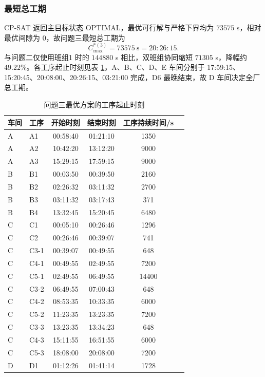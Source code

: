 \documentclass[12pt,a4paper]{article}
\begin{document}
\subsubsection{最短总工期}

CP-SAT 返回主目标状态 OPTIMAL，最优可行解与严格下界均为 $73575$ s，相对最优间隙为 0，故问题三最短总工期为
\begin{equation}
C_{\max}^{*(3)}=73575\ \text{s}=20:26:15 .
\end{equation}
与问题二仅使用班组1 时的 $144880$ s 相比，双班组协同缩短 $71305$ s，降幅约 $49.22\%$。各工序起止时刻见表 \ref{tab:p3schedule}，A、B、C、D、E 车间分别于 17:59:15、15:20:45、20:08:00、20:26:15、03:21:00 完成，D6 最晚结束，故 D 车间决定全厂总工期。

\begin{table}[H]
\centering
\caption{问题三最优方案的工序起止时刻}
\small
\label{tab:p3schedule}
\begin{tabular}{llcccc}
\toprule
车间 & 工序 & 开始时刻 & 结束时刻 & 工序持续时间/s \\
\midrule
A & A1 & 00:58:40 & 01:21:10 & 1350 \\
A & A2 & 10:42:20 & 13:12:20 & 9000 \\
A & A3 & 15:29:15 & 17:59:15 & 9000 \\
\midrule
B & B1 & 00:03:50 & 00:39:50 & 2160 \\
B & B2 & 02:26:32 & 03:11:32 & 2700 \\
B & B3 & 03:11:32 & 03:17:43 & 371 \\
B & B4 & 13:32:45 & 15:20:45 & 6480 \\
\midrule
C & C1 & 00:05:10 & 00:26:46 & 1296 \\
C & C2 & 00:26:46 & 00:39:07 & 741 \\
C & C3-1 & 00:39:07 & 00:49:55 & 648 \\
C & C4-1 & 00:49:55 & 02:49:55 & 7200 \\
C & C5-1 & 02:49:55 & 06:49:55 & 14400 \\
C & C3-2 & 06:49:55 & 07:00:43 & 648 \\
C & C4-2 & 08:53:35 & 10:33:35 & 6000 \\
C & C5-2 & 11:23:35 & 13:23:35 & 7200 \\
C & C3-3 & 13:23:35 & 13:34:23 & 648 \\
C & C4-3 & 15:11:55 & 16:51:55 & 6000 \\
C & C5-3 & 18:08:00 & 20:08:00 & 7200 \\
\midrule
D & D1 & 01:12:26 & 01:41:14 & 1728 \\

\end{tabular}
\end{table}
\end{document}
